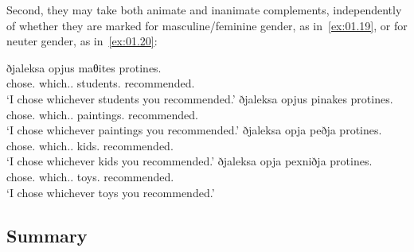 \documentclass[output=paper]{langsci/langscibook}
\begin{document}
\ea {}\label{ex:01.18}
	\z
\z

Second, they may take both animate and inanimate complements, independently of
whether they are marked for masculine/feminine gender, as in~\eqref{ex:01.19}, or for
neuter gender, as in~\eqref{ex:01.20}:

\ea {}\label{ex:01.19}
	\ea
		\gll ðjaleksa opjus maθites protines.\\
			chose.\Fsg{} which.\M{}.\Pl{} students.\Acc{} recommended.\Ssg{}\\
		\glt ‘I chose whichever students you recommended.'
	\ex
		\gll ðjaleksa opjus pinakes protines.\\
			chose.\Fsg{} which.\M{}.\Pl{} paintings.\Acc{} recommended.\Ssg{}\\
		\glt ‘I chose whichever paintings you recommended.'
	\z
\ex {}\label{ex:01.20}
	\ea
		\gll ðjaleksa opja peðja protines.\\
			chose.\Fsg{} which.\glossN.\Pl{} kids.\Acc{} recommended.\Ssg{}\\
		\glt ‘I chose whichever kids you recommended.'
	\ex
		\gll ðjaleksa opja pexniðja protines.\\
			chose.\Fsg{} which.\glossN.\Pl{} toys.\Acc{} recommended.\Ssg{}\\
		\glt ‘I chose whichever toys you recommended.'
	\z
\z

\subsection{Summary}
\end{document}
